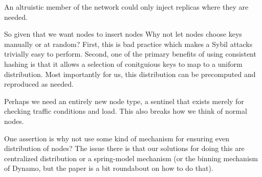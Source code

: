 An altruistic member of the network could only inject replicas where they are needed.





So given that we want nodes to insert nodes Why not let nodes choose keys manually or at random?
First, this is bad practice which makes a Sybil attacks trivially easy to perform.
Second, one of the primary benefits of using consistent hashing is that it allows a selection of conitguious keys to map to a uniform distribution.
Most importantly for us, this distribution can be precomputed and reproduced as needed. 


Perhaps we need an entirely new node type, a sentinel that exists merely for checking traffic conditions and load.
This also breaks how we think of normal nodes.

One assertion is why not use some kind of mechanism for ensuring even distribution of nodes?
The issue there is that our solutions for doing this are centralized distribution or a spring-model mechanism (or the binning mechanism of Dynamo, but the paper is a bit roundabout on how to do that).